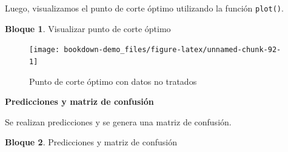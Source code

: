 \documentclass[]{book}
\newenvironment{Shaded}{\begin{snugshade}}{\end{snugshade}}
\newcommand{\DataTypeTok}[1]{\textcolor[rgb]{0.13,0.29,0.53}{#1}}
\newcommand{\DecValTok}[1]{\textcolor[rgb]{0.00,0.00,0.81}{#1}}
\newcommand{\FloatTok}[1]{\textcolor[rgb]{0.00,0.00,0.81}{#1}}
\newcommand{\KeywordTok}[1]{\textcolor[rgb]{0.13,0.29,0.53}{\textbf{#1}}}
\newcommand{\NormalTok}[1]{#1}
\newcommand{\OperatorTok}[1]{\textcolor[rgb]{0.81,0.36,0.00}{\textbf{#1}}}
\newcommand{\OtherTok}[1]{\textcolor[rgb]{0.56,0.35,0.01}{#1}}
\newcommand{\StringTok}[1]{\textcolor[rgb]{0.31,0.60,0.02}{#1}}
\theoremstyle{definition}
\theoremstyle{definition}
\newtheorem{example}{Bloque}[chapter]
\theoremstyle{definition}
\theoremstyle{definition}
\theoremstyle{remark}
\begin{document}
\begin{Shaded}
\end{Shaded}

Luego, visualizamos el punto de corte óptimo utilizando la función \texttt{plot()}.

\begin{example}
\protect\hypertarget{exm:bloque19nbm}{}{\label{exm:bloque19nbm} }Visualizar punto de corte óptimo
\end{example}

\begin{Shaded}
\end{Shaded}

\begin{figure}
\texttt{[image: bookdown-demo\_files/figure-latex/unnamed-chunk-92-1]} \caption{Punto de corte óptimo con datos no tratados}\label{fig:unnamed-chunk-92}
\end{figure}

\textbf{Predicciones y matriz de confusión}

Se realizan predicciones y se genera una matriz de confusión.

\begin{example}
\protect\hypertarget{exm:bloque20nbm}{}{\label{exm:bloque20nbm} }Predicciones y matriz de confusión
\end{example}
\end{document}
